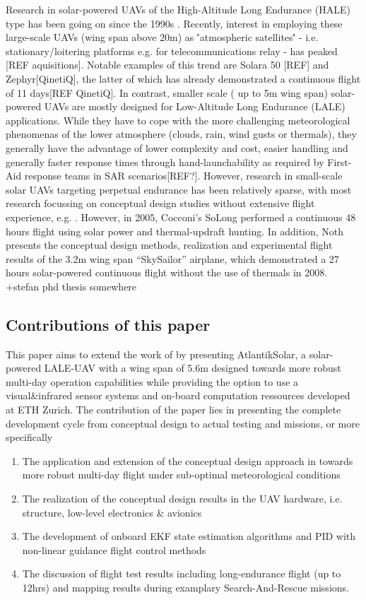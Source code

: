 \documentclass[letterpaper, 10 pt, conference]{ieeeconf}  %
\begin{document}
Research in solar-powered UAVs of the High-Altitude Long Endurance (HALE) type has been going on since the 1990s \cite{Noth_PhD}. Recently, interest in employing these large-scale UAVs (wing span above 20m) as \''atmospheric satellites\'' - i.e. stationary/loitering platforms e.g. for telecommunications relay - has peaked [REF aquisitions]. Notable examples of this trend are Solara 50 [REF] and Zephyr[QinetiQ], the latter of which has already demonstrated a continuous flight of 11 days[REF QinetiQ]. In contrast, smaller scale ( up to 5m wing span) solar-powered UAVs are mostly designed for Low-Altitude Long Endurance (LALE) applications. While they have to cope with the more challenging meteorological phenomenas of the lower atmosphere (clouds, rain, wind gusts or thermals), they generally have the advantage of lower complexity and cost, easier handling and generally faster response times through hand-launchability as required by First-Aid response teams in SAR scenarios[REF?]. However, research in small-scale solar UAVs targeting perpetual endurance has been relatively sparse, with most research focussing on conceptual design studies without extensive flight experience, e.g. \cite{Morton_ICRA2013}. However, in 2005, Cocconi's SoLong \cite{Cocconi_SoLong} performed a continuous 48 hours flight using solar power and thermal-updraft hunting. In addition, Noth \cite{Noth_PhD} presents the conceptual design methods, realization and experimental flight results of the 3.2m wing span ``SkySailor'' airplane, which demonstrated a 27 hours solar-powered continuous flight without the use of thermals in 2008. 
+stefan phd thesis somewhere

\subsection{Contributions of this paper}
This paper aims to extend the work of \cite{Cocconi_SoLong,Noth_PhD} by presenting AtlantikSolar, a solar-powered LALE-UAV with a wing span of 5.6m designed towards more robust multi-day operation capabilities while providing the option to use a visual\&infrared sensor systems and on-board computation ressources developed at ETH Zurich. The contribution of the paper lies in presenting the complete development cycle from conceptual design to actual testing and missions, or more specifically
  
 \begin{enumerate}
\item The application and extension of the conceptual design approach in \cite{Noth_PhD,Leutenegger_JIRS} towards more robust multi-day flight under sub-optimal meteorological conditions
\item The realization of the conceptual design results in the UAV hardware, i.e. structure, low-level electronics \& avionics 
\item The development of onboard EKF state estimation algorithms and PID with non-linear guidance flight control methods
\item The discussion of flight test results including long-endurance flight (up to 12hrs) and mapping results during examplary Search-And-Rescue missions.
\end{enumerate}
\end{document}

